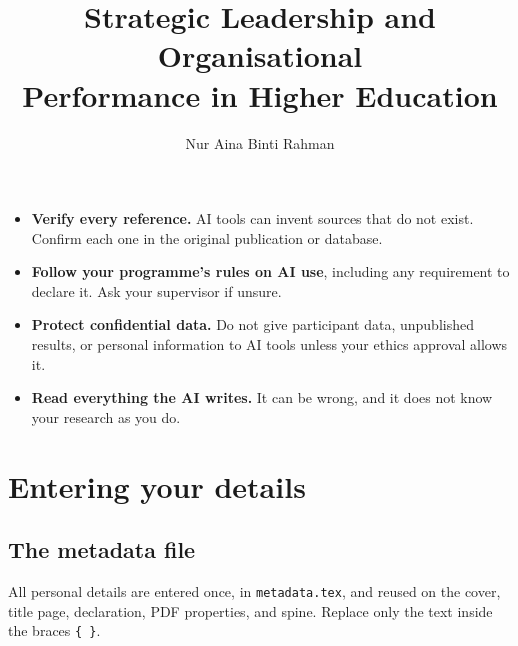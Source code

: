 \documentclass[11pt,a4paper]{article}
\newcommand\file[1]{\texttt{#1}}
\begin{document}
\begin{warnbox}
\begin{itemize}[leftmargin=1.4em,itemsep=2pt,topsep=2pt]
  \item \textbf{Verify every reference.} AI tools can invent sources that do not
        exist. Confirm each one in the original publication or database.
  \item \textbf{Follow your programme's rules on AI use}, including any
        requirement to declare it. Ask your supervisor if unsure.
  \item \textbf{Protect confidential data.} Do not give participant data,
        unpublished results, or personal information to AI tools unless your
        ethics approval allows it.
  \item \textbf{Read everything the AI writes.} It can be wrong, and it does not
        know your research as you do.
\end{itemize}
\end{warnbox}

\section{Entering your details}\label{sec:details}

\subsection{The metadata file}

All personal details are entered once, in \file{metadata.tex}, and reused on
the cover, title page, declaration, PDF properties, and spine. Replace only the
text inside the braces \texttt{\{~\}}.

\begin{code}
\title{Strategic Leadership and Organisational\\ Performance in Higher Education}
\author{Nur Aina Binti Rahman}             %
\address{Kuala Lumpur, Malaysia}
\end{code}
\end{document}
